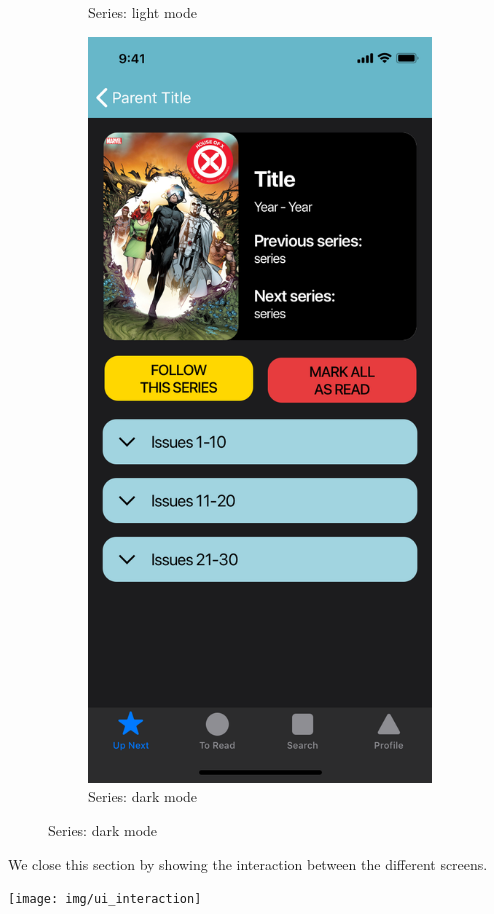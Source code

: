 \begin{figure}[p]
\begin{subfigure}[b]{0.4\textwidth}
    \caption{Series: light mode}
    \label{fig:1}
  \end{subfigure}
  \hfill
  \begin{subfigure}[b]{0.4\textwidth}
    \includegraphics[width=\textwidth]{img/mockups/dark_mode}
    \caption{Series: dark mode}
    \label{fig:2}
  \end{subfigure}
\end{figure}

\clearpage

We close this section by showing the interaction between the different screens.
\vspace{15mm}

\texttt{[image: img/ui\_interaction]}

